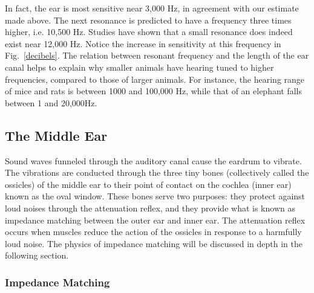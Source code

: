 In fact, the ear is most sensitive near 3,000 Hz, in agreement with our estimate made above.  The next resonance is predicted to have a frequency three times higher, i.e. 10,500 Hz.  Studies have shown that a small resonance does indeed exist near 12,000 Hz. Notice the increase in sensitivity at this frequency in Fig.~\ref{decibels}. The relation between resonant frequency and the length of the ear canal helps to explain why smaller animals have hearing tuned to higher frequencies, compared to those of larger animals. For instance, the hearing range of mice and rats is between 1000 and 100,000 Hz, while that of an elephant falls between 1 and 20,000Hz.  

\subsection{The Middle Ear}

Sound waves funneled through the auditory canal cause the eardrum to vibrate.  The vibrations are conducted through the three tiny bones (collectively called the ossicles) of the middle ear to their point of contact on the cochlea (inner ear) known as the oval window.  These bones serve two purposes: they protect against loud noises through the attenuation reflex, and they provide what is known as impedance matching between the outer ear and inner ear.  The attenuation reflex occurs when muscles reduce the action of the ossicles in response to a harmfully loud noise.  The physics of impedance matching will be discussed in depth in the following section.

\subsubsection{Impedance Matching}

